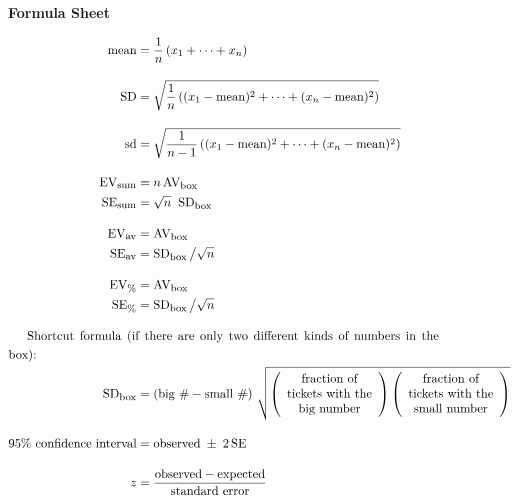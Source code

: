\documentclass[10pt]{article}
\begin{document}
\vfill
\eject

\begin{center}
\textbf{\large Formula Sheet}
\end{center}


\begin{align*}
\mbox{mean} &=\frac{1}{n}\left(x_1 + \cdots + x_n\right)\\[10pt]
\mbox{SD}   &=\sqrt{\frac{1}{n}\left( (x_1 - \mbox{mean})^2 + \cdots + (x_n - \mbox{mean})^2\right)}\\[10pt]
\mbox{sd}   &=\sqrt{\frac{1}{n-1}\left( (x_1 - \mbox{mean})^2 + \cdots + (x_n - \mbox{mean})^2\right)}\\[10pt]
%
\mbox{EV}_{\mbox{\footnotesize sum}} & = n\,\mbox{AV}_{\mbox{\footnotesize box}}\\
\mbox{SE}_{\mbox{\footnotesize sum}} & = \sqrt{n}\;\;\mbox{SD}_{\mbox{\footnotesize box}}\\[10pt]
%
\mbox{EV}_{\mbox{\footnotesize av}} & = \mbox{AV}_{\mbox{\footnotesize box}}\\
\mbox{SE}_{\mbox{\footnotesize av}} & = \mbox{SD}_{\mbox{\footnotesize box}}\,\big{/}\sqrt{n}\\[10pt]
%
\mbox{EV}_{\mbox{\footnotesize \%}} & = \mbox{AV}_{\mbox{\footnotesize box}}\\
\mbox{SE}_{\mbox{\footnotesize \%}} & = \mbox{SD}_{\mbox{\footnotesize box}}\,\big{/}\sqrt{n}\\[10pt]
%
\noalign{Shortcut formula (if there are only two different kinds of numbers in the box):}
\mbox{SD}_{\mbox{\footnotesize box}} &=
  \left(\mbox{big \#} - \mbox{small \#}\right)\,\sqrt{
  \left(\begin{array}{c}\mbox{fraction of}\\ \mbox{tickets with the}\\ \mbox{big number}\end{array}\right)
  \left(\begin{array}{c}\mbox{fraction of}\\\mbox{tickets with the}\\\mbox{small number}\end{array}\right)}\\[10pt]
%
\mbox{95\% confidence interval} &= \mbox{observed} \;\pm\; 2\,\mbox{SE}\\[10pt]
z &= \frac{\mbox{observed} - \mbox{expected}}{\mbox{standard error}}
\end{align*}
\vfill
\eject

\end{document}
